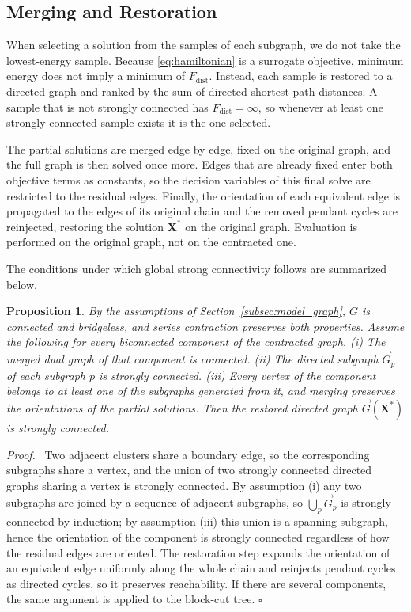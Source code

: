 \documentclass[twocolumn,a4paper]{article}
\newtheorem{proposition}[theorem]{Proposition}
\newenvironment{proof}{\par\noindent\textit{Proof.}\ }{\hfill\(\square\)\par\medskip}
\begin{document}
\subsection{Merging and Restoration}

When selecting a solution from the samples of each subgraph, we do not take the lowest-energy sample. Because \eqref{eq:hamiltonian} is a surrogate objective, minimum energy does not imply a minimum of \(F_{\mathrm{dist}}\). Instead, each sample is restored to a directed graph and ranked by the sum of directed shortest-path distances. A sample that is not strongly connected has \(F_{\mathrm{dist}}=\infty\), so whenever at least one strongly connected sample exists it is the one selected.

The partial solutions are merged edge by edge, fixed on the original graph, and the full graph is then solved once more. Edges that are already fixed enter both objective terms as constants, so the decision variables of this final solve are restricted to the residual edges. Finally, the orientation of each equivalent edge is propagated to the edges of its original chain and the removed pendant cycles are reinjected, restoring the solution \(\mathbf{X}^{*}\) on the original graph. Evaluation is performed on the original graph, not on the contracted one.

The conditions under which global strong connectivity follows are summarized below.

\begin{proposition} \label{prop:sc}
By the assumptions of Section~\ref{subsec:model_graph}, \(G\) is connected and bridgeless, and series contraction preserves both properties. Assume the following for every biconnected component of the contracted graph. (i) The merged dual graph of that component is connected. (ii) The directed subgraph \(\vec{G}_p\) of each subgraph \(p\) is strongly connected. (iii) Every vertex of the component belongs to at least one of the subgraphs generated from it, and merging preserves the orientations of the partial solutions. Then the restored directed graph \(\vec{G}(\mathbf{X}^{*})\) is strongly connected.
\end{proposition}

\begin{proof}
Two adjacent clusters share a boundary edge, so the corresponding subgraphs share a vertex, and the union of two strongly connected directed graphs sharing a vertex is strongly connected. By assumption (i) any two subgraphs are joined by a sequence of adjacent subgraphs, so \(\bigcup_p\vec{G}_p\) is strongly connected by induction; by assumption (iii) this union is a spanning subgraph, hence the orientation of the component is strongly connected regardless of how the residual edges are oriented. The restoration step expands the orientation of an equivalent edge uniformly along the whole chain and reinjects pendant cycles as directed cycles, so it preserves reachability. If there are several components, the same argument is applied to the block-cut tree.
\end{proof}
\end{document}
